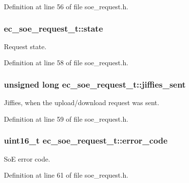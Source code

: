 \-Definition at line 56 of file soe\-\_\-request.\-h.

\subsubsection[{state}]{ {\bf ec\-\_\-soe\-\_\-request\-\_\-t\-::state}}\label{structec__soe__request__t_ad019a8fb7fd83ffc0744713d0247b217}


\-Request state. 



\-Definition at line 58 of file soe\-\_\-request.\-h.

\subsubsection[{jiffies\-\_\-sent}]{\setlength{\rightskip}{0pt plus 5cm}unsigned long {\bf ec\-\_\-soe\-\_\-request\-\_\-t\-::jiffies\-\_\-sent}}\label{structec__soe__request__t_acb9e954735012f3e149bdd207afbc3a7}


\-Jiffies, when the upload/download request was sent. 



\-Definition at line 59 of file soe\-\_\-request.\-h.

\subsubsection[{error\-\_\-code}]{\setlength{\rightskip}{0pt plus 5cm}uint16\-\_\-t {\bf ec\-\_\-soe\-\_\-request\-\_\-t\-::error\-\_\-code}}\label{structec__soe__request__t_a9fe2cb324e505e6e0123e310dcbc4dcc}


\-So\-E error code. 



\-Definition at line 61 of file soe\-\_\-request.\-h.

